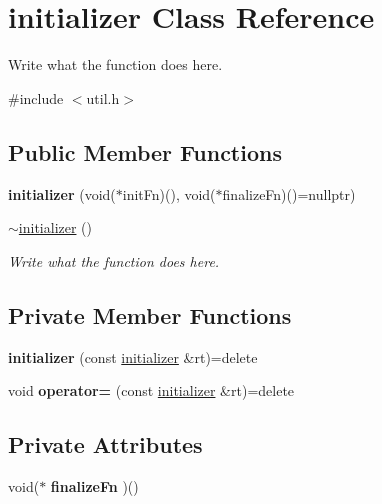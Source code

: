 \hypertarget{classinitializer}{\section{initializer Class Reference}
\label{classinitializer}
}


Write what the function does here.  




{\ttfamily \#include $<$util.\+h$>$}

\subsection*{Public Member Functions}
\begin{DoxyCompactItemize}
\item 
\hypertarget{classinitializer_ad7eff8ec9662dda6c90a5eebbb5bb774}{{\bfseries initializer} (void($\ast$init\+Fn)(), void($\ast$finalize\+Fn)()=nullptr)}\label{classinitializer_ad7eff8ec9662dda6c90a5eebbb5bb774}

\item 
\hyperlink{classinitializer_a9ac296c0a8420f783af46a77792f4253}{$\sim$initializer} ()
\begin{DoxyCompactList}\small\item\em Write what the function does here. \end{DoxyCompactList}\end{DoxyCompactItemize}
\subsection*{Private Member Functions}
\begin{DoxyCompactItemize}
\item 
\hypertarget{classinitializer_a040920f2a1db4d0545d84c81ec6319d9}{{\bfseries initializer} (const \hyperlink{classinitializer}{initializer} \&rt)=delete}\label{classinitializer_a040920f2a1db4d0545d84c81ec6319d9}

\item 
\hypertarget{classinitializer_a622a590c3eeac8414877886cddb3c133}{void {\bfseries operator=} (const \hyperlink{classinitializer}{initializer} \&rt)=delete}\label{classinitializer_a622a590c3eeac8414877886cddb3c133}

\end{DoxyCompactItemize}
\subsection*{Private Attributes}
\begin{DoxyCompactItemize}
\item 
\hypertarget{classinitializer_abb0e43532e705e711cb64318defa0a4f}{void($\ast$ {\bfseries finalize\+Fn} )()}\label{classinitializer_abb0e43532e705e711cb64318defa0a4f}

\end{DoxyCompactItemize}


